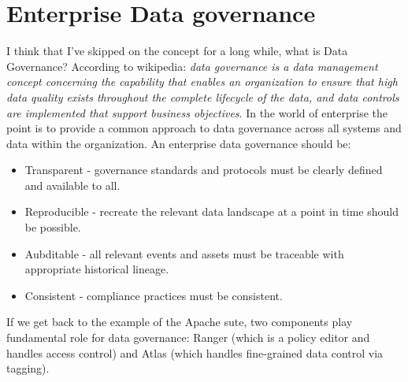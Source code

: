 \section{Enterprise Data governance}
I think that I've skipped on the concept for a long while, what is Data Governance?
According to wikipedia: \textit{data governance is a data management concept concerning the capability that enables an organization to ensure that high data quality exists throughout the complete lifecycle of the data, and data controls are implemented that support business objectives}. \n
In the world of enterprise the point is to provide a common approach to data governance across all systems and data within the organization. An enterprise data governance should be:
\begin{itemize}
    \item Transparent - governance standards and protocols must be clearly defined and available to all.
    \item Reproducible - recreate the relevant data landscape at a point in time should be possible.
    \item Aubditable - all relevant events and assets must be traceable with appropriate historical lineage.
    \item Consistent - compliance practices must be consistent.
\end{itemize}
If we get back to the example of the Apache sute, two components play fundamental role for data governance:
Ranger (which is a policy editor and handles access control) and Atlas (which handles fine-grained data control via tagging). \n
